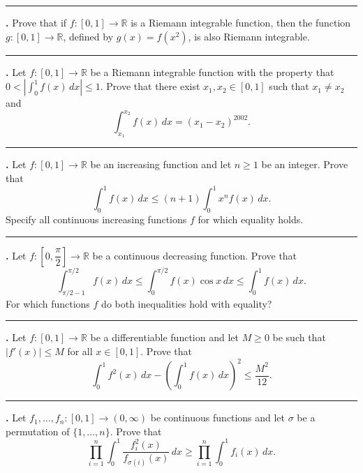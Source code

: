 \documentclass[11pt]{article}
\newcounter{probnum}
\newenvironment{problembox}{\par\noindent\rule{\linewidth}{0.5pt}\vspace{5pt}\par}{\vspace{2pt}}
\begin{document}
\begin{problembox}
\textbf{\theprobnum.} Prove that if $f : [0,1] \to \mathbb{R}$ is a Riemann integrable function, then the function $g : [0,1] \to \mathbb{R}$, defined by $g(x) = f(x^2)$, is also Riemann integrable.
\end{problembox}

\begin{problembox}
\textbf{\theprobnum.} Let $f : [0,1] \to \mathbb{R}$ be a Riemann integrable function with the property that $0 < \left|\displaystyle\int_0^1 f(x)\,dx\right| \le 1$. Prove that there exist $x_1, x_2 \in [0,1]$ such that $x_1 \ne x_2$ and
\[
\int_{x_1}^{x_2} f(x)\,dx = (x_1 - x_2)^{2002}.
\]
\end{problembox}

\begin{problembox}
\textbf{\theprobnum.} Let $f : [0,1] \to \mathbb{R}$ be an increasing function and let $n \ge 1$ be an integer. Prove that
\[
\int_0^1 f(x)\,dx \le (n+1) \int_0^1 x^n f(x)\,dx.
\]
Specify all continuous increasing functions $f$ for which equality holds.
\end{problembox}

\begin{problembox}
\textbf{\theprobnum.} Let $f : \left[0, \dfrac{\pi}{2}\right] \to \mathbb{R}$ be a continuous decreasing function. Prove that
\[
\int_{\pi/2 - 1}^{\pi/2} f(x)\,dx \le \int_0^{\pi/2} f(x) \cos x\,dx \le \int_0^1 f(x)\,dx.
\]
For which functions $f$ do both inequalities hold with equality?
\end{problembox}

\begin{problembox}
\textbf{\theprobnum.} Let $f : [0,1] \to \mathbb{R}$ be a differentiable function and let $M \ge 0$ be such that $|f'(x)| \le M$ for all $x \in [0,1]$. Prove that
\[
\int_0^1 f^2(x)\,dx - \left(\int_0^1 f(x)\,dx\right)^2 \le \frac{M^2}{12}.
\]
\end{problembox}

\begin{problembox}
\textbf{\theprobnum.} Let $f_1, \ldots, f_n : [0,1] \to (0,\infty)$ be continuous functions and let $\sigma$ be a permutation of $\{1,\ldots,n\}$. Prove that
\[
\prod_{i=1}^{n} \int_0^1 \frac{f_i^2(x)}{f_{\sigma(i)}(x)}\,dx \ge \prod_{i=1}^{n} \int_0^1 f_i(x)\,dx.
\]
\end{problembox}
\end{document}
